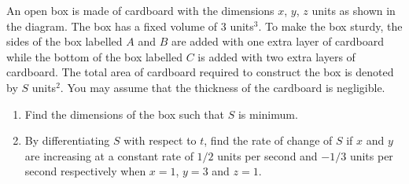 \clearpage
\begin{problem}
    An open box is made of cardboard with the dimensions $x$, $y$, $z$ units as shown in the diagram. The box has a fixed volume of 3 units$^3$. To make the box sturdy, the sides of the box labelled $A$ and $B$ are added with one extra layer of cardboard while the bottom of the box labelled $C$ is added with two extra layers of cardboard. The total area of cardboard required to construct the box is denoted by $S$ units$^2$. You may assume that the thickness of the cardboard is negligible.

    \begin{center}
    \end{center}

    \begin{enumerate}
        \item Find the dimensions of the box such that $S$ is minimum.
        \item By differentiating $S$ with respect to $t$, find the rate of change of $S$ if $x$ and $y$ are increasing at a constant rate of $1/2$ units per second and $-1/3$ units per second respectively when $x = 1$, $y = 3$ and $z = 1$.
    \end{enumerate}
\end{problem}
